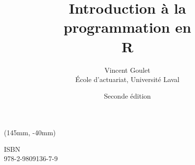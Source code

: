 \documentclass[letterpaper,11pt]{memoir}
\title{\HUGE
    \fontseries{b}\selectfont Introduction
    \fontseries{m}\selectfont  à la \\
    \fontseries{b}\selectfont programmation
    \fontseries{m}\selectfont  en \\
    \fontseries{b}\selectfont\scalefont{15} R}
\author{\huge Vincent Goulet \\[3mm]
    \large École d'actuariat, Université Laval}
\date{\Large Seconde édition}
\newcommand{\ISBN}{978-2-9809136-7-9}
\theoremstyle{plain}
\theoremstyle{remark}
\theoremstyle{definition}
\begin{document}
\renewcommand{\FrenchLabelItem}{>}
\renewcommand{\labelitemii}{\textendash}


\frontmatter

\pagestyle{empty}


\pagestyle{companion}

\tableofcontents*

\mainmatter










\appendix








\cleardoublepage
\printindex

\cleardoublepage
\cleartoverso

\pagestyle{empty}
\pagestyle{empty}
\renewcommand{\ttdefault}{hlst}

\begin{textblock*}{71mm}(145mm, -40mm)
  \large\ttfamily\raggedright
  \textblockcolor{}
  ISBN \\ \ISBN
\end{textblock*}
\end{document}
